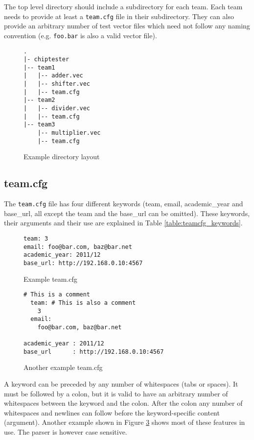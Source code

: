 The top level directory should include a subdirectory for each team. Each team needs
to provide at least a \texttt{team.cfg} file in their subdirectory. They can also provide
an arbitrary number of test vector files which need not follow any naming
convention (e.g. \texttt{foo.bar} is also a valid vector file).

\begin{figure}[h!]
\lstset{basicstyle=\scriptsize\ttfamily}
\begin{lstlisting}
.
|- chiptester
|-- team1
|   |-- adder.vec
|   |-- shifter.vec
|   |-- team.cfg
|-- team2
|   |-- divider.vec
|   |-- team.cfg
|-- team3
    |-- multiplier.vec
    |-- team.cfg
\end{lstlisting}
\caption{Example directory layout}
\label{listing:dir_layout}
\end{figure}

\subsection{team.cfg}
The \texttt{team.cfg} file has four different keywords (team, email,
academic\_year and base\_url, all except the team and the base\_url can be omitted).
These keywords, their arguments and their use are explained in Table \ref{table:teamcfg_keywords}.

\begin{figure}[h!]
\lstset{basicstyle=\scriptsize\ttfamily}
\begin{lstlisting}
team: 3
email: foo@bar.com, baz@bar.net
academic_year: 2011/12
base_url: http://192.168.0.10:4567
\end{lstlisting}
\caption{Example team.cfg}
\label{listing:teamcfg_example1}
\end{figure}



\begin{figure}[h!]
\lstset{basicstyle=\scriptsize\ttfamily}
\begin{lstlisting}
# This is a comment
  team: # This is also a comment
    3
  email:
    foo@bar.com, baz@bar.net

academic_year : 2011/12
base_url      : http://192.168.0.10:4567
\end{lstlisting}
\caption{Another example team.cfg}
\label{listing:teamcfg_example2}
\end{figure}


A keyword can be preceded by any number of whitespaces (tabs or spaces). It must be followed
by a colon, but it is valid to have an arbitrary number of whitespaces between the keyword
and the colon. After the colon any number of whitespaces and newlines can follow before
the keyword-specific content (argument). Another example shown in Figure \ref{listing:teamcfg_example2} shows most of these features
in use. The parser is however case sensitive.
\\

